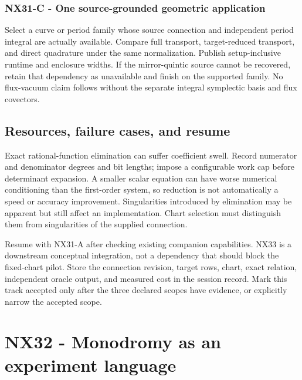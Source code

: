 \documentclass[
  11pt,
  a4paper,
]{report}
\begin{document}
\hypertarget{nx31-c---one-source-grounded-geometric-application}{%
\subsection{NX31-C - One source-grounded geometric
application}\label{nx31-c---one-source-grounded-geometric-application}}

Select a curve or period family whose source connection and independent
period integral are actually available. Compare full transport,
target-reduced transport, and direct quadrature under the same
normalization. Publish setup-inclusive runtime and enclosure widths. If
the mirror-quintic source cannot be recovered, retain that dependency as
unavailable and finish on the supported family. No flux-vacuum claim
follows without the separate integral symplectic basis and flux
covectors.

\hypertarget{resources-failure-cases-and-resume}{%
\section{Resources, failure cases, and
resume}\label{resources-failure-cases-and-resume}}

Exact rational-function elimination can suffer coefficient swell. Record
numerator and denominator degrees and bit lengths; impose a configurable
work cap before determinant expansion. A smaller scalar equation can
have worse numerical conditioning than the first-order system, so
reduction is not automatically a speed or accuracy improvement.
Singularities introduced by elimination may be apparent but still affect
an implementation. Chart selection must distinguish them from
singularities of the supplied connection.

Resume with NX31-A after checking existing companion capabilities. NX33
is a downstream conceptual integration, not a dependency that should
block the fixed-chart pilot. Store the connection revision, target rows,
chart, exact relation, independent oracle output, and measured cost in
the session record. Mark this track accepted only after the three
declared scopes have evidence, or explicitly narrow the accepted scope.

\hypertarget{nx32---monodromy-as-an-experiment-language}{%
\chapter{NX32 - Monodromy as an experiment
language}\label{nx32---monodromy-as-an-experiment-language}}
\end{document}
